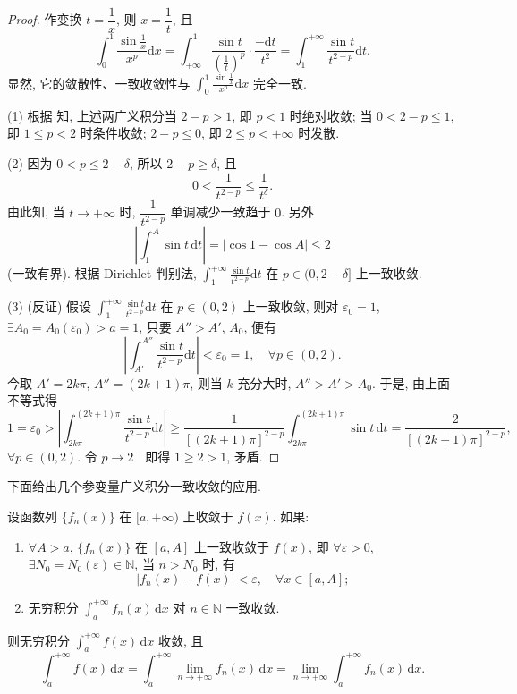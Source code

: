 \begin{proof}
作变换 $t=\dfrac{1}{x}$, 则 $x=\dfrac{1}{t}$, 且
\[
  \int_{0}^{1}\frac{\sin\frac{1}{x}}{x^{p}}\mathrm{d}x=\int_{+\infty}^{1}\frac{\sin t}{\left(\frac{1}{t}\right)^{p}}\cdot\frac{-\mathrm{d}t}{t^{2}}=\int_{1}^{+\infty}\frac{\sin t}{t^{2-p}}\mathrm{d}t.
\]
显然, 它的敛散性、一致收敛性与 $\displaystyle\int_{0}^{1}\frac{\sin\frac{1}{x}}{x^{p}}\mathrm{d}x$ 完全一致.

(1) 根据 知, 上述两广义积分当 $2-p>1$, 即 $p<1$ 时绝对收敛; 当 $0<2-p\leqslant1$, 即 $1\leqslant p<2$ 时条件收敛; $2-p\leqslant0$, 即 $2\leqslant p<+\infty$ 时发散.

(2) 因为 $0<p\leqslant2-\delta$, 所以 $2-p\geqslant\delta$, 且
\[
  0<\frac{1}{t^{2-p}}\leqslant\frac{1}{t^{\delta}}.
\]
由此知, 当 $t\to+\infty$ 时, $\dfrac{1}{t^{2-p}}$ 单调减少一致趋于 $0$. 另外
\[
  \left|\int_{1}^{A}\sin t\,\mathrm{d}t\right|=|\cos1-\cos A|\leqslant2
\]
(一致有界). 根据 Dirichlet 判别法, $\displaystyle\int_{1}^{+\infty}\frac{\sin t}{t^{2-p}}\mathrm{d}t$ 在 $p\in(0,2-\delta]$ 上一致收敛.

(3) (反证) 假设 $\displaystyle\int_{1}^{+\infty}\frac{\sin t}{t^{2-p}}\mathrm{d}t$ 在 $p\in(0,2)$ 上一致收敛, 则对 $\varepsilon_{0}=1$, $\exists A_{0}=A_{0}(\varepsilon_{0})>a=1$, 只要 $A''>A'$, $A_{0}$, 便有
\[
  \left|\int_{A'}^{A''}\frac{\sin t}{t^{2-p}}\mathrm{d}t\right|<\varepsilon_{0}=1,\quad\forall p\in(0,2).
\]
今取 $A'=2k\pi$, $A''=(2k+1)\pi$, 则当 $k$ 充分大时, $A''>A'>A_{0}$. 于是, 由上面不等式得
\[
  1=\varepsilon_{0}>\left|\int_{2k\pi}^{(2k+1)\pi}\frac{\sin t}{t^{2-p}}\mathrm{d}t\right|\geqslant\frac{1}{[(2k+1)\pi]^{2-p}}\int_{2k\pi}^{(2k+1)\pi}\sin t\,\mathrm{d}t=\frac{2}{[(2k+1)\pi]^{2-p}},
\]
$\forall p\in(0,2)$. 令 $p\to2^{-}$ 即得 $1\geqslant2>1$, 矛盾.
\end{proof}


下面给出几个参变量广义积分一致收敛的应用.

\begin{theorem}[无穷区间上极限号与广义积分号可交换的充分条件]\label{thm:15.2.6}
设函数列 $\{f_{n}(x)\}$ 在 $[a,+\infty)$ 上收敛于 $f(x)$. 如果:
\begin{enumerate}
  \item $\forall A>a$, $\{f_{n}(x)\}$ 在 $[a,A]$ 上一致收敛于 $f(x)$, 即 $\forall\varepsilon>0$, $\exists N_{0}=N_{0}(\varepsilon)\in\mathbb{N}$, 当 $n>N_{0}$ 时, 有
  \[
    |f_{n}(x)-f(x)|<\varepsilon,\quad\forall x\in[a,A];
\]
  \item 无穷积分 $\displaystyle\int_{a}^{+\infty}f_{n}(x)\,\mathrm{d}x$ 对 $n\in\mathbb{N}$ 一致收敛.
\end{enumerate}
则无穷积分 $\displaystyle\int_{a}^{+\infty}f(x)\,\mathrm{d}x$ 收敛, 且
\[
  \int_{a}^{+\infty}f(x)\,\mathrm{d}x=\int_{a}^{+\infty}\lim_{n\to+\infty}f_{n}(x)\,\mathrm{d}x=\lim_{n\to+\infty}\int_{a}^{+\infty}f_{n}(x)\,\mathrm{d}x.
\]
\end{theorem}

